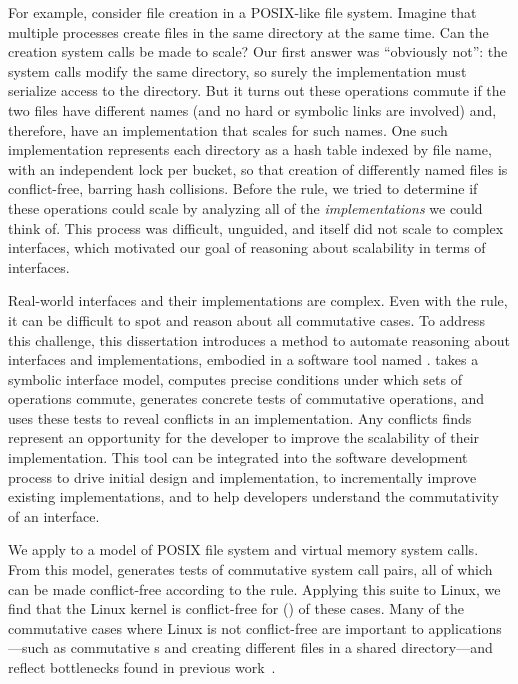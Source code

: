 For example,
consider file creation in a POSIX-like file system. Imagine that
multiple processes create files in the same directory at the same
time. Can the creation system calls be made to scale? Our
first answer was ``obviously not'': the system calls modify the same
directory, so surely the implementation must
serialize access to the directory. But it turns
out these operations commute if the two files have different names
(and no hard or symbolic links are involved) and, therefore, have an
implementation that scales for such names.
One such implementation represents each directory as a hash table
indexed by file name, with an independent lock per bucket,
so that creation of differently named files is conflict-free, barring
hash collisions.
%
Before the rule, we tried to determine if these
operations could scale by analyzing all of the \emph{implementations}
we could think
of.  This process was difficult, unguided, and itself did not scale to
complex interfaces, which
motivated our goal of reasoning about
scalability in terms of interfaces.


Real-world interfaces and their implementations are complex.
Even with the rule, it can be difficult to spot and
reason about all commutative cases.
%
%
To address this challenge, this dissertation introduces a method to
automate reasoning about interfaces and implementations, embodied in a
software tool named \tool.
%
\tool takes a symbolic interface model,
computes precise conditions under which sets of operations commute,
generates concrete tests of commutative operations,
and uses these tests to reveal conflicts in an implementation.
%
Any conflicts \tool finds represent an opportunity for the developer
to improve the scalability of their implementation.
%
This tool can be
integrated into the software development process to drive initial design and
implementation, to incrementally improve existing implementations, and to
help developers understand the commutativity of an interface.

We apply \tool to a model of
 POSIX file system and virtual memory system
calls.
%
From this model,
\tool generates  tests of commutative
system call pairs, all of which can be made conflict-free
according to the rule.
%
Applying this suite to Linux, we find that the Linux kernel is
conflict-free for 
() of
these cases.
%
Many of the commutative cases where Linux is not conflict-free are
important to applications---such as commutative
s and creating different files in a shared directory---and
reflect bottlenecks found in previous
work~\cite{boyd-wickizer:scaling}.

